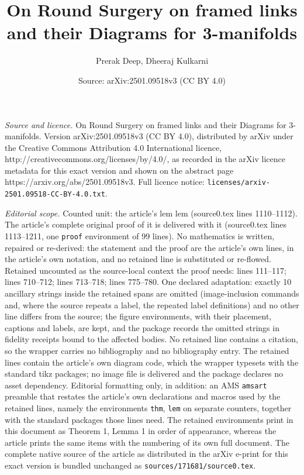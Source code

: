 \documentclass[10pt,a4paper]{amsart}
\title{On Round Surgery on framed links and their Diagrams for 3-manifolds}
\author{Prerak Deep, Dheeraj Kulkarni}
\date{Source: arXiv:2501.09518v3 (CC BY 4.0)}
\begin{document}
\maketitle

\noindent\emph{Source and licence.} On Round Surgery on framed links and their Diagrams for 3-manifolds. Version arXiv:2501.09518v3 (CC BY 4.0), distributed by arXiv under the Creative Commons Attribution 4.0 International licence, http://creativecommons.org/licenses/by/4.0/, as recorded in the arXiv licence metadata for this exact version and shown on the abstract page https://arxiv.org/abs/2501.09518v3. Full licence notice: \texttt{licenses/arxiv-2501.09518-CC-BY-4.0.txt}.\par\smallskip

\noindent\textit{Editorial scope.} Counted unit: the article's lem lem (source0.tex lines 1110--1112). The article's complete original proof of it is delivered with it (source0.tex lines 1113--1211, one \texttt{proof} environment of 99 lines). No mathematics is written, repaired or re-derived: the statement and the proof are the article's own lines, in the article's own notation, and no retained line is substituted or re-flowed.  Retained uncounted as the source-local context the proof needs: lines 111--117; lines 710--712; lines 713--718; lines 775--780.  One declared adaptation: exactly 10 ancillary strings inside the retained spans are omitted (image-inclusion commands and, where the source repeats a label, the repeated label definitions) and no other line differs from the source; the figure environments, with their placement, captions and labels, are kept, and the package records the omitted strings in fidelity receipts bound to the affected bodies.  No retained line contains a citation, so the wrapper carries no bibliography and no bibliography entry.  The retained lines contain the article's own diagram code, which the wrapper typesets with the standard tikz packages; no image file is delivered and the package declares no asset dependency.  Editorial formatting only, in addition: an AMS \texttt{amsart} preamble that restates the article's own declarations and macros used by the retained lines, namely the environments \texttt{thm}, \texttt{lem} on separate counters, together with the standard packages those lines need.  The retained environments print in this document as Theorem 1, Lemma 1 in order of appearance, whereas the article prints the same items with the numbering of its own full document.  The complete native source of the article as distributed in the arXiv e-print for this exact version is bundled unchanged as \texttt{sources/171681/source0.tex}.
\end{document}
